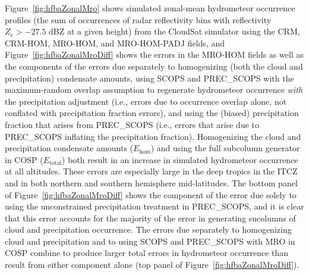 Figure~\ref{fig:hfbaZonalMro} shows simulated zonal-mean hydrometeor
occurrence profiles (the sum of occurrences of radar reflectivity bins
with reflectivity \(Z_e > -27.5\) dBZ at a given height) from the
CloudSat simulator using the CRM, CRM-HOM, MRO-HOM, and MRO-HOM-PADJ
fields, and Figure~\ref{fig:hfbaZonalMroDiff} shows the errors in the
MRO-HOM fields as well as the components of the errors due separately to
homogenizing (both the cloud and precipitation) condensate amounts,
using SCOPS and PREC\_SCOPS with the maximum-random overlap assumption
to regenerate hydrometeor occurrence \emph{with} the precipitation
adjustment (i.e., errors due to occurrence overlap alone, not conflated
with precipitation fraction errors), and using the (biased)
precipitation fraction that arises from PREC\_SCOPS (i.e., errors that
arise due to PREC\_SCOPS inflating the precipitation fraction).
Homogenizing the cloud and precipitation condensate amounts
(\(E_\textrm{hom}\)) and using the full subcolumn generator in COSP
(\(E_\textrm{total}\)) both result in an increase in simulated
hydrometeor occurrence at all altitudes. These errors are especially
large in the deep tropics in the ITCZ and in both northern and southern
hemisphere mid-latitudes. The bottom panel of
Figure~\ref{fig:hfbaZonalMroDiff} shows the component of the error due
solely to using the unconstrained precipitation treatment in
PREC\_SCOPS, and it is clear that this error accounts for the majority
of the error in generating sucolumns of cloud and precipitation
occurrence. The errors due separately to homogenizing cloud and
precipitation and to using SCOPS and PREC\_SCOPS with MRO in COSP
combine to produce larger total errors in hydrometeor occurrence than
result from either component alone (top panel of
Figure~\ref{fig:hfbaZonalMroDiff}).


